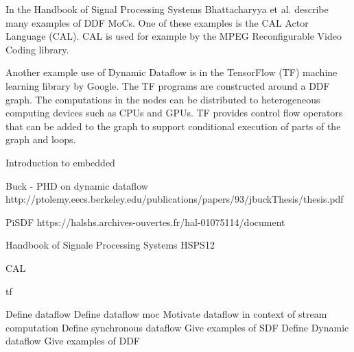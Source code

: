In the Handbook of Signal Processing Systems Bhattacharyya et al. describe many
examples of DDF MoCs. One of these examples is the CAL Actor Language (CAL). CAL
is used for example by the MPEG Reconfigurable Video Coding library.

Another example use of Dynamic Dataflow is in the TensorFlow (TF) machine
learning library by Google. The TF programs are constructed around a DDF graph.
The computations in the nodes can be distributed to heterogeneous computing
devices such as CPUs and GPUs. TF provides control flow operators that can be
added to the graph to support conditional execution of parts of the graph and
loops.

Introduction to embedded \cite{lee2015introduction}

Buck - PHD on dynamic dataflow http://ptolemy.eecs.berkeley.edu/publications/papers/93/jbuckThesis/thesis.pdf
\cite{buck1993scheduling}

PiSDF https://halshs.archives-ouvertes.fr/hal-01075114/document
\cite{desnos2013pimm}

Handbook of Signale Processing Systems HSPS12
\cite{bhattacharyya2013handbook}

CAL \cite{eker2003cal}

tf \cite{tensorflow2015-whitepaper}

Define dataflow
Define dataflow moc
Motivate dataflow in context of stream computation
Define synchronous dataflow
Give examples of SDF
Define Dynamic dataflow
Give examples of DDF

